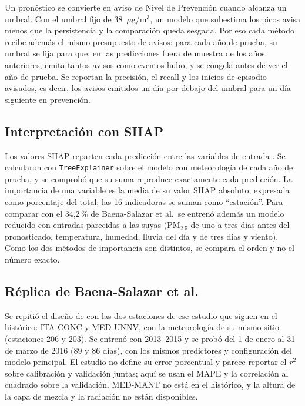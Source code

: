 \documentclass[conference]{IEEEtran}
\begin{document}
Un pronóstico se convierte en aviso de Nivel de Prevención cuando alcanza
un umbral. Con el umbral fijo de 38~$\mu$g/m$^3$, un modelo que subestima
los picos avisa menos que la persistencia y la comparación queda sesgada.
Por eso cada método recibe además el mismo presupuesto de avisos: para cada
año de prueba, su umbral se fija para que, en las predicciones fuera de
muestra de los años anteriores, emita tantos avisos como eventos hubo, y
se congela antes de ver el año de prueba. Se reportan la precisión, el
recall y los inicios de episodio avisados, es decir, los avisos emitidos
un día por debajo del umbral para un día siguiente en prevención.

\subsection{Interpretación con SHAP}

Los valores SHAP reparten cada predicción entre las variables de entrada
\cite{lundberg2017unified}. Se calcularon con \texttt{TreeExplainer}
\cite{lundberg2020local} sobre el modelo con meteorología de cada año de
prueba, y se comprobó que su suma reproduce exactamente cada predicción.
La importancia de una variable es la media de su valor SHAP absoluto,
expresada como porcentaje del total; las 16 indicadoras se suman como
``estación''. Para comparar con el 34,2\,\% de Baena-Salazar et al.\ se
entrenó además un modelo reducido con entradas parecidas a las suyas
(PM$_{2.5}$ de uno a tres días antes del pronosticado, temperatura,
humedad, lluvia del día y de tres días y viento). Como los dos métodos de
importancia son distintos, se compara el orden y no el número exacto.

\subsection{Réplica de Baena-Salazar et al.}

Se repitió el diseño de \cite{baena2019red} con las dos estaciones de ese
estudio que siguen en el histórico: ITA-CONC y MED-UNNV, con la
meteorología de su mismo sitio (estaciones 206 y 203). Se entrenó con
2013--2015 y se probó del 1 de enero al 31 de marzo de 2016 (89 y 86
días), con los mismos predictores y configuración del modelo principal.
El estudio no define su error porcentual y parece reportar el $r^2$ sobre
calibración y validación juntas; aquí se usan el MAPE y la correlación al
cuadrado sobre la validación. MED-MANT no está en el histórico, y la
altura de la capa de mezcla y la radiación no están disponibles.
\end{document}
